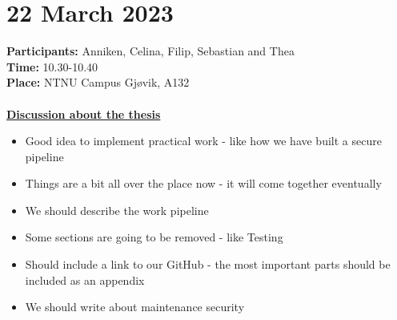 \section{22 March 2023}
\textbf{Participants:} Anniken, Celina, Filip, Sebastian and Thea \\
\textbf{Time:} 10.30-10.40 \\
\textbf{Place:} NTNU Campus Gjøvik, A132
\\~\\
\textbf{\underline{Discussion about the thesis}}
\begin{itemize}
    \item Good idea to implement practical work - like how we have built a secure pipeline
    \item Things are a bit all over the place now - it will come together eventually
    \item We should describe the work pipeline
    \item Some sections are going to be removed - like Testing
    \item Should include a link to our GitHub - the most important parts should be included as an appendix
    \item We should write about maintenance security
\end{itemize}